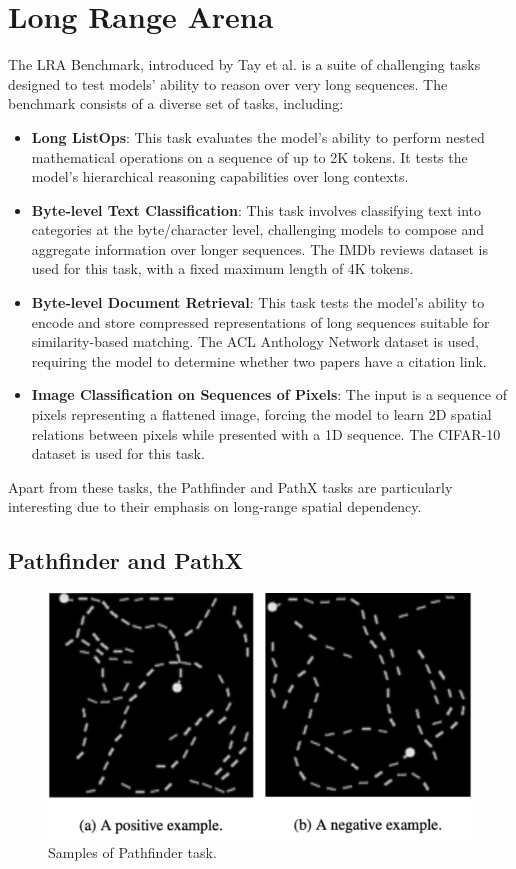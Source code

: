 \documentclass[12pt,a4paper]{report}
\begin{document}
\section{Long Range Arena}
The LRA Benchmark, introduced by Tay et al. \cite{lra} is a suite of challenging tasks designed to test models' ability to reason over very long sequences. The benchmark consists of a diverse set of tasks, including:
\begin{itemize}
    \item \textbf{Long ListOps}: This task evaluates the model's ability to perform nested mathematical operations on a sequence of up to 2K tokens. It tests the model's hierarchical reasoning capabilities over long contexts.
    \item \textbf{Byte-level Text Classification}: This task involves classifying text into categories at the byte/character level, challenging models to compose and aggregate information over longer sequences. The IMDb reviews dataset is used for this task, with a fixed maximum length of 4K tokens.
    \item \textbf{Byte-level Document Retrieval}: This task tests the model's ability to encode and store compressed representations of long sequences suitable for similarity-based matching. The ACL Anthology Network dataset is used, requiring the model to determine whether two papers have a citation link.
    \item \textbf{Image Classification on Sequences of Pixels}: The input is a sequence of pixels representing a flattened image, forcing the model to learn 2D spatial relations between pixels while presented with a 1D sequence. The CIFAR-10 dataset is used for this task.
\end{itemize}

Apart from these tasks, the Pathfinder and PathX tasks are particularly interesting due to their emphasis on long-range spatial dependency.

\subsection{Pathfinder and PathX}

\begin{figure}[ht]
    \centerline{\includegraphics[scale=0.5]{C1.2_PathFinder_Tasks.png}}
    \caption{Samples of Pathfinder task.}
    \label{pathfinder-task}
\end{figure}
\end{document}
